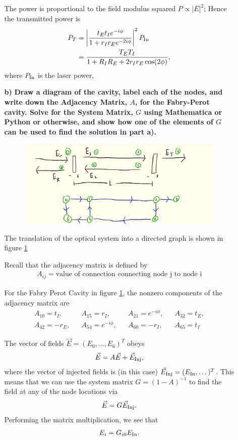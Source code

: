 \documentclass[11pt]{article}
\begin{document}
\begin{enumerate}
\begin{itemize}
The power is proportional to the field modulus squared $P\propto |E|^2$; Hence the transmitted power is
\begin{align}
P_T&=\left |\frac{t_Et_I e^{-i\phi}}{1+r_Ir_E e^{-2i\phi}} \right |^2P_{\rm In} \nonumber \\
&=\frac{T_ET_I}{1+R_IR_E+2r_Ir_E\cos(2\phi)}
,
\end{align}
where $P_{\rm In}$ is the laser power,

\item[\bf b)] {\bf Draw a diagram of the cavity, label each of the nodes, and write down the Adjacency Matrix, $A$, for the Fabry-Perot cavity. Solve for the System Matrix, $G$ using Mathematica or Python or otherwise, and show how one of the elements of $G$ can be used to find the solution in part a).}

\begin{figure}[t]
\includegraphics[width =1\columnwidth]{FPgraph}
\caption{
}
\label{fig:FPgraph}
\end{figure}

The translation of the optical system into a directed graph is shown in figure \ref{fig:FPgraph}

Recall that the adjacency matrix is defined by
\begin{align}
A_{ij}=\text{value of connection connecting node j to node i}
\end{align}

For the Fabry Perot Cavity in figure \ref{fig:FPgraph}, the nonzero components of the adjacency matrix are
\begin{align}
&A_{10}=t_I ,& &A_{15}=r_I,& & A_{21}=e^{-i\phi},& &A_{32}=t_E,& \nonumber \\
&A_{42}=-r_E,&
&A_{54}=e^{-i\phi},&
&A_{60}=-r_I,&
&A_{65}=t_I&
\end{align}

The vector of fields $\vec E =(E_0, \dots, E_6)^T$ obeys
\begin{align}
\vec E =A \vec E +\vec E_{\rm Inj},
\end{align}
where  the vector of injected fields is (in this case) $\vec E_{\rm Inj}=(E_{\rm In},\dots)^T$. This means that we can use the system matrix $G=(1-A)^{-1}$ to find the field at any of the node locations via
\begin{align}
\vec E =G \vec E_{\rm Inj} .
\end{align}
Performing the matrix multiplication, we see that
\begin{align}
E_i=G_{i0}E_{\rm In}.
\end{align}


\end{itemize}
\end{enumerate}
\end{document}
